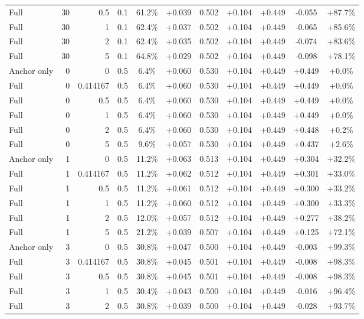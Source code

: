 \begin{table}[htbp]
\begin{tabular}{lrrrccccccc}
Full & 30 & 0.5 & 0.1 & 61.2\% & +0.039 & 0.502 & +0.104 & +0.449 & -0.055 & +87.7\% \\
Full & 30 & 1 & 0.1 & 62.4\% & +0.037 & 0.502 & +0.104 & +0.449 & -0.065 & +85.6\% \\
Full & 30 & 2 & 0.1 & 62.4\% & +0.035 & 0.502 & +0.104 & +0.449 & -0.074 & +83.6\% \\
Full & 30 & 5 & 0.1 & 64.8\% & +0.029 & 0.502 & +0.104 & +0.449 & -0.098 & +78.1\% \\
Anchor only & 0 & 0 & 0.5 & 6.4\% & +0.060 & 0.530 & +0.104 & +0.449 & +0.449 & +0.0\% \\
Full & 0 & 0.414167 & 0.5 & 6.4\% & +0.060 & 0.530 & +0.104 & +0.449 & +0.449 & +0.0\% \\
Full & 0 & 0.5 & 0.5 & 6.4\% & +0.060 & 0.530 & +0.104 & +0.449 & +0.449 & +0.0\% \\
Full & 0 & 1 & 0.5 & 6.4\% & +0.060 & 0.530 & +0.104 & +0.449 & +0.449 & +0.0\% \\
Full & 0 & 2 & 0.5 & 6.4\% & +0.060 & 0.530 & +0.104 & +0.449 & +0.448 & +0.2\% \\
Full & 0 & 5 & 0.5 & 9.6\% & +0.057 & 0.530 & +0.104 & +0.449 & +0.437 & +2.6\% \\
Anchor only & 1 & 0 & 0.5 & 11.2\% & +0.063 & 0.513 & +0.104 & +0.449 & +0.304 & +32.2\% \\
Full & 1 & 0.414167 & 0.5 & 11.2\% & +0.062 & 0.512 & +0.104 & +0.449 & +0.301 & +33.0\% \\
Full & 1 & 0.5 & 0.5 & 11.2\% & +0.061 & 0.512 & +0.104 & +0.449 & +0.300 & +33.2\% \\
Full & 1 & 1 & 0.5 & 11.2\% & +0.060 & 0.512 & +0.104 & +0.449 & +0.300 & +33.3\% \\
Full & 1 & 2 & 0.5 & 12.0\% & +0.057 & 0.512 & +0.104 & +0.449 & +0.277 & +38.2\% \\
Full & 1 & 5 & 0.5 & 21.2\% & +0.039 & 0.507 & +0.104 & +0.449 & +0.125 & +72.1\% \\
Anchor only & 3 & 0 & 0.5 & 30.8\% & +0.047 & 0.500 & +0.104 & +0.449 & -0.003 & +99.3\% \\
Full & 3 & 0.414167 & 0.5 & 30.8\% & +0.045 & 0.501 & +0.104 & +0.449 & -0.008 & +98.3\% \\
Full & 3 & 0.5 & 0.5 & 30.8\% & +0.045 & 0.501 & +0.104 & +0.449 & -0.008 & +98.3\% \\
Full & 3 & 1 & 0.5 & 30.4\% & +0.043 & 0.500 & +0.104 & +0.449 & -0.016 & +96.4\% \\
Full & 3 & 2 & 0.5 & 30.8\% & +0.039 & 0.500 & +0.104 & +0.449 & -0.028 & +93.7\% \\

\end{tabular}
\end{table}
